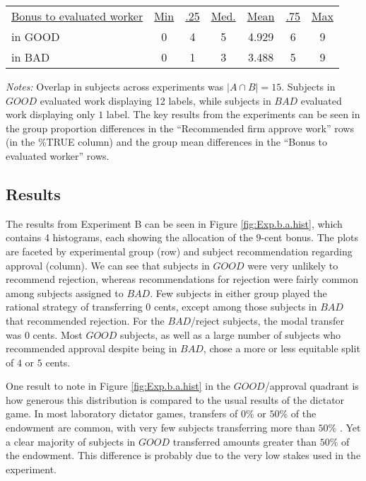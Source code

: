 \documentclass[12pt]{article}
\begin{document}
\begin{table}[h!]
\begin{center}
\begin{tabular}{lcccccc}
  \underline{Bonus to evaluated worker} &  \underline{Min} & \underline{.25} & \underline{Med.} & \underline{Mean} & \underline{.75} & \underline{Max}\\ 
  \hspace{10pt} in GOOD     & 0 & 4 & 5 & 4.929 & 6 & 9  \\
  \hspace{10pt} in BAD      & 0 & 1 & 3 & 3.488 & 5 & 9  \\
  \bottomrule 
  \end{tabular}
\end{center} 
\emph{Notes:} Overlap in subjects across experiments was $|A \cap
B|=15$.  Subjects in $GOOD$ evaluated work displaying 12 labels, while
subjects in $BAD$ evaluated work displaying only $1$ label. The key
results from the experiments can be seen in the group proportion
differences in the ``Recommended firm approve work'' rows (in the
\%TRUE column) and the group mean differences in the ``Bonus to
evaluated worker'' rows. 
\end{table} 


\subsection{Results} 
The results from Experiment B can be seen in Figure
\ref{fig:Exp.b.a.hist}, which contains 4 histograms, each showing the
allocation of the $9$-cent bonus. The plots are faceted by
experimental group (row) and subject recommendation regarding approval
(column). We can see that subjects in $GOOD$ were very unlikely to
recommend rejection, whereas recommendations for rejection were fairly
common among subjects assigned to $BAD$. Few subjects in either group
played the rational strategy of transferring $0$ cents, except among
those subjects in $BAD$ that recommended rejection. For the
$BAD$/reject subjects, the modal transfer was $0$ cents. Most $GOOD$
subjects, as well as a large number of subjects who recommended
approval despite being in $BAD$, chose a more or less equitable split
of $4$ or $5$ cents.

One result to note in Figure \ref{fig:Exp.b.a.hist} in the
$GOOD$/approval quadrant is how generous this distribution is compared
to the usual results of the dictator game. In most laboratory dictator
games, transfers of $0\%$ or $50\%$ of the endowment are common, with
very few subjects transferring more than $50\%$
\citep{engel2010dictator}. Yet a clear majority of subjects in $GOOD$
transferred amounts greater than $50\%$ of the endowment. This
difference is probably due to the very low stakes used in the
experiment.
\end{document}
